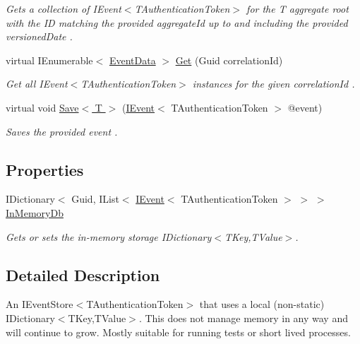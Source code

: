 \begin{DoxyCompactItemize}
\begin{DoxyCompactList}\small\item\em Gets a collection of I\+Event$<$\+T\+Authentication\+Token$>$ for the {\itshape T} aggregate root with the ID matching the provided {\itshape aggregate\+Id}  up to and including the provided {\itshape versioned\+Date} . \end{DoxyCompactList}\item 
virtual I\+Enumerable$<$ \hyperlink{classCqrs_1_1Events_1_1EventData}{Event\+Data} $>$ \hyperlink{classCqrs_1_1Events_1_1InProcessEventStore_a3d04ebb3354c7a5980b3a7e9586285fc_a3d04ebb3354c7a5980b3a7e9586285fc}{Get} (Guid correlation\+Id)
\begin{DoxyCompactList}\small\item\em Get all I\+Event$<$\+T\+Authentication\+Token$>$ instances for the given {\itshape correlation\+Id} . \end{DoxyCompactList}\item 
virtual void \hyperlink{classCqrs_1_1Events_1_1InProcessEventStore_a72dbd170c7e89e1a7bd313d2b3900c64_a72dbd170c7e89e1a7bd313d2b3900c64}{Save$<$ T $>$} (\hyperlink{interfaceCqrs_1_1Events_1_1IEvent}{I\+Event}$<$ T\+Authentication\+Token $>$ @event)
\begin{DoxyCompactList}\small\item\em Saves the provided {\itshape event} . \end{DoxyCompactList}\end{DoxyCompactItemize}
\subsection*{Properties}
\begin{DoxyCompactItemize}
\item 
I\+Dictionary$<$ Guid, I\+List$<$ \hyperlink{interfaceCqrs_1_1Events_1_1IEvent}{I\+Event}$<$ T\+Authentication\+Token $>$ $>$ $>$ \hyperlink{classCqrs_1_1Events_1_1InProcessEventStore_a4d0dee81baa7348a2d16fd0878220bd4_a4d0dee81baa7348a2d16fd0878220bd4}{In\+Memory\+Db}
\begin{DoxyCompactList}\small\item\em Gets or sets the in-\/memory storage I\+Dictionary$<$\+T\+Key,\+T\+Value$>$. \end{DoxyCompactList}\end{DoxyCompactItemize}


\subsection{Detailed Description}
An I\+Event\+Store$<$\+T\+Authentication\+Token$>$ that uses a local (non-\/static) I\+Dictionary$<$\+T\+Key,\+T\+Value$>$. This does not manage memory in any way and will continue to grow. Mostly suitable for running tests or short lived processes. 


